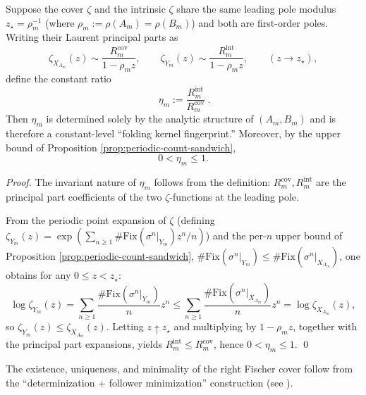 \begin{proposition}\label{prop:Ym-zeta-residue-ratio}
Suppose the cover \(\zeta\) and the intrinsic \(\zeta\) share the same leading pole modulus \(z_\star=\rho_m^{-1}\) (where \(\rho_m:=\rho(A_m)=\rho(B_m)\)) and both are first-order poles. Writing their Laurent principal parts as
\[
\zeta_{X_{A_m}}(z)\sim \frac{R_m^{\mathrm{cov}}}{1-\rho_m z},
\qquad
\zeta_{Y_m}(z)\sim \frac{R_m^{\mathrm{int}}}{1-\rho_m z},
\qquad (z\to z_\star),
\]
define the constant ratio
\[
\boxed{\ \eta_m:=\frac{R_m^{\mathrm{int}}}{R_m^{\mathrm{cov}}}\ }.
\]
Then \(\eta_m\) is determined solely by the analytic structure of \((A_m,B_m)\) and is therefore a constant-level ``folding kernel fingerprint.'' Moreover, by the upper bound of Proposition \ref{prop:periodic-count-sandwich},
\[
0<\eta_m\le 1.
\]
\end{proposition}
\begin{proof}
The invariant nature of \(\eta_m\) follows from the definition: \(R_m^{\mathrm{cov}},R_m^{\mathrm{int}}\) are the principal part coefficients of the two \(\zeta\)-functions at the leading pole.

From the periodic point expansion of \(\zeta\) (defining \(\zeta_{Y_m}(z)=\exp(\sum_{n\ge 1}\#\mathrm{Fix}(\sigma^n|_{Y_m})z^n/n)\)) and the per-$n$ upper bound of Proposition \ref{prop:periodic-count-sandwich},
\(\#\mathrm{Fix}(\sigma^n|_{Y_m})\le \#\mathrm{Fix}(\sigma^n|_{X_{A_m}})\),
one obtains for any \(0\le z<z_\star\):
\[
\log\zeta_{Y_m}(z)
=\sum_{n\ge 1}\frac{\#\mathrm{Fix}(\sigma^n|_{Y_m})}{n}z^n
\le
\sum_{n\ge 1}\frac{\#\mathrm{Fix}(\sigma^n|_{X_{A_m}})}{n}z^n
=\log\zeta_{X_{A_m}}(z),
\]
so \(\zeta_{Y_m}(z)\le \zeta_{X_{A_m}}(z)\). Letting \(z\uparrow z_\star\) and multiplying by \(1-\rho_m z\), together with the principal part expansions, yields \(R_m^{\mathrm{int}}\le R_m^{\mathrm{cov}}\), hence \(0<\eta_m\le 1\). \qed
\end{proof}



The existence, uniqueness, and minimality of the right Fischer cover follow from the ``determinization + follower minimization'' construction (see \cite{LindMarcus1995,Kitchens1998SymbolicDynamics}).

